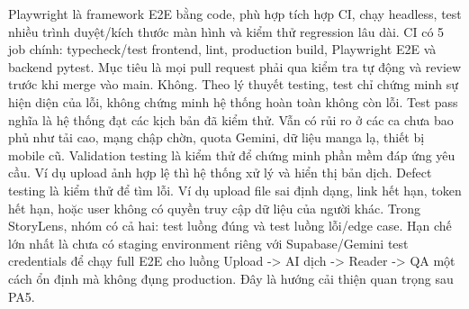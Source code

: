 {}Playwright là framework E2E bằng code, phù hợp tích hợp CI, chạy headless, test nhiều trình duyệt/kích thước màn hình và kiểm thử regression lâu dài.\markdownRendererInterblockSeparator
{}
\markdownRendererSectionEnd \markdownRendererSectionBegin
{}\markdownRendererInterblockSeparator
{}CI có 5 job chính: typecheck/test frontend, lint, production build, Playwright E2E và backend pytest.\markdownRendererParagraphSeparator
{}Mục tiêu là mọi pull request phải qua kiểm tra tự động và review trước khi merge vào main.\markdownRendererInterblockSeparator
{}
\markdownRendererSectionEnd \markdownRendererSectionBegin
{}\markdownRendererInterblockSeparator
{}Không. Theo lý thuyết testing, test chỉ chứng minh sự hiện diện của lỗi, không chứng minh hệ thống hoàn toàn không còn lỗi.\markdownRendererParagraphSeparator
{}Test pass nghĩa là hệ thống đạt các kịch bản đã kiểm thử. Vẫn có rủi ro ở các ca chưa bao phủ như tải cao, mạng chập chờn, quota Gemini, dữ liệu manga lạ, thiết bị mobile cũ.\markdownRendererInterblockSeparator
{}
\markdownRendererSectionEnd \markdownRendererSectionBegin
{}\markdownRendererInterblockSeparator
{}Validation testing là kiểm thử để chứng minh phần mềm đáp ứng yêu cầu. Ví dụ upload ảnh hợp lệ thì hệ thống xử lý và hiển thị bản dịch.\markdownRendererParagraphSeparator
{}Defect testing là kiểm thử để tìm lỗi. Ví dụ upload file sai định dạng, link hết hạn, token hết hạn, hoặc user không có quyền truy cập dữ liệu của người khác.\markdownRendererParagraphSeparator
{}Trong StoryLens, nhóm có cả hai: test luồng đúng và test luồng lỗi/edge case.\markdownRendererInterblockSeparator
{}
\markdownRendererSectionEnd \markdownRendererSectionBegin
{}\markdownRendererInterblockSeparator
{}Hạn chế lớn nhất là chưa có staging environment riêng với Supabase/Gemini test credentials để chạy full E2E cho luồng Upload -> AI dịch -> Reader -> Q\markdownRendererAmpersand{}A một cách ổn định mà không đụng production.\markdownRendererParagraphSeparator
{}Đây là hướng cải thiện quan trọng sau PA5.\markdownRendererInterblockSeparator
{}\markdownRendererThematicBreak{}\markdownRendererInterblockSeparator
{}
\markdownRendererSectionEnd 
\markdownRendererSectionEnd \markdownRendererSectionBegin
{}\markdownRendererInterblockSeparator
